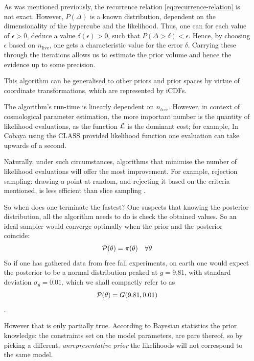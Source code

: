 \documentclass[usenatbib]{mnras}
\begin{document}
As was mentioned previously, the recurrence relation
\eqref{eq:recurrence-relation} is not exact. However, \(P(\Delta)\)
is a known distribution, dependent on the dimensionality of the
hypercube and the likelihood. Thus, one can for each value of
\(\epsilon>0\), deduce a value \(\delta(\epsilon) >0\), such that
\(P(\Delta > \delta) < \epsilon\). Hence, by choosing \(\epsilon\)
based on \(n_\text{live}\), one gets a characteristic value for the
error \(\delta\). Carrying these through the iterations allows us to
estimate the prior volume and hence the evidence up to some
precision.

This algorithm can be generalised to other priors and prior spaces
by virtue of coordinate transformations, which are represented by
iCDFs.

The algorithm's run-time is linearly dependent on
\(n_{live}\). However, in context of cosmological parameter
estimation, the more important number is the quantity of likelihood
evaluations, as the function \({\cal L}\) is the dominant cost; for
example, In Cobaya using the CLASS provided likelihood function one
evaluation can take upwards of a second. 

Naturally, under such circumstances, algorithms that minimise the
number of likelihood evaluations will offer the most
improvement. For example, rejection sampling: drawing a point at
random, and rejecting it based on the criteria mentioned, is less
efficient than slice sampling \citep{Neal_2003}.

So when does one terminate the fastest? One suspects that knowing
the posterior distribution, all the algorithm needs to do is check
the obtained values. So an ideal sampler would converge optimally
when the prior and the posterior coincide: 
\[\begin{array}{rl} {\cal P}(\theta) = \pi(\theta) & \forall \theta \end{array} \]
So if one has gathered data from free fall experiments, on earth
one would expect the posterior to be a normal distribution peaked
at \(g=9.81\), with standard deviation \(\sigma_{g} = 0.01\), which we
shall compactly refer to as \[{\cal P}(\theta) = G(9.81, 0.01)\].

However that is only partially true. According to Bayesian
statistics the prior knowledge: the constraints set on the model
parameters, are pare thereof, so by picking a different,
\emph{unrepresentative prior} the likelihoods will not correspond to the
same model. 
\end{document}
